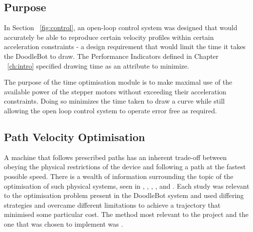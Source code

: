 \subsection{Purpose}
In Section ~\ref{fig:control}, an open-loop control system was designed that would accurately be able to reproduce certain velocity profiles within certain acceleration constraints - a design requirement that would limit the time it takes the DoodleBot to draw. The Performance Indicators defined in Chapter ~\ref{ch:intro} specified drawing time as an attribute to minimize.

The purpose of the time optimisation module is to make maximal use of the available power of the stepper motors without exceeding their acceleration constraints. Doing so minimizes the time taken to draw a curve while still allowing the open loop control system to operate error free as required.

\subsection{Path Velocity Optimisation}
A machine that follows prescribed paths has an inherent trade-off between obeying the physical restrictions of the device and following a path at the fastest possible speed. There is a wealth of information surrounding the topic of the optimisation of such physical systems, seen in \cite{Bardine10},  \cite{Chen07}, \cite{Choi01}, \cite{Tseng09}, \cite{Schutter09} and \cite{Yeh99}. Each study was relevant to the optimisation problem present in the DoodleBot system and used differing strategies and overcame different limitations to achieve a trajectory that minimised some particular cost. The method most relevant to the project and the one that was chosen to implement was \cite{Schutter09}.

